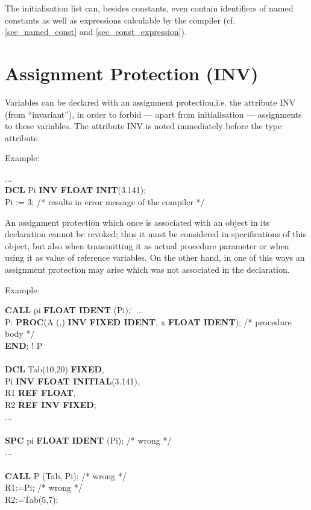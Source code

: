 The initialisation list can, besides constants, even contain identifiers
of named constants as well as expressions calculable by the compiler
(cf. \ref{sec_named_const} and \ref{sec_const_expression}).

\section{Assignment Protection (INV)}    %
\label{sec_inv}

Variables can be declared with an assignment protection,i.e. the attribute
INV (from ``invariant''), in order to forbid --- apart from
initialisation --- assignments to these variables. The attribute INV is
noted immediately before the type attribute.

Example:

...\\
{\bf DCL} Pi {\bf INV FLOAT INIT}(3.141);\\

Pi := 3;  /* results in error message of the compiler */

An assignment protection which once is associated with an object in its
declaration cannot be revoked; thus it must be considered in
specifications of this object, but also when transmitting it as actual
procedure parameter or when using it as value of reference variables. On
the other hand, in one of this ways an assignment protection may arise
which was not associated in the declaration.

Example:

\begin{tabbing}
{\bf CALL} \= pi {\bf FLOAT IDENT} (Pi); \= \kill
... \> \> \\
P:  \> {\bf PROC}(A (,) {\bf INV FIXED IDENT}, x {\bf FLOAT IDENT}); /* procedure body */ \> \\
    \> {\bf END}; ! P \> \\
    \> \> \\
{\bf DCL} \> Tab(10,20) {\bf FIXED}, \> \\
          \> Pi {\bf INV FLOAT INITIAL}(3.141), \> \\
          \> R1 {\bf REF FLOAT}, \> \\
          \> R2 {\bf REF INV FIXED}; \> \\
... \> \> \\
    \> \> \\
{\bf SPC} \> pi {\bf FLOAT IDENT} (Pi); \> /* wrong */ \\
... \> \> \\
    \> \> \\
{\bf CALL} \> P (Tab, Pi); \> /* wrong */ \\
R1:=Pi;    \>              \> /* wrong */ \\
R2:=Tab(5,7); \> \>
\end{tabbing}

